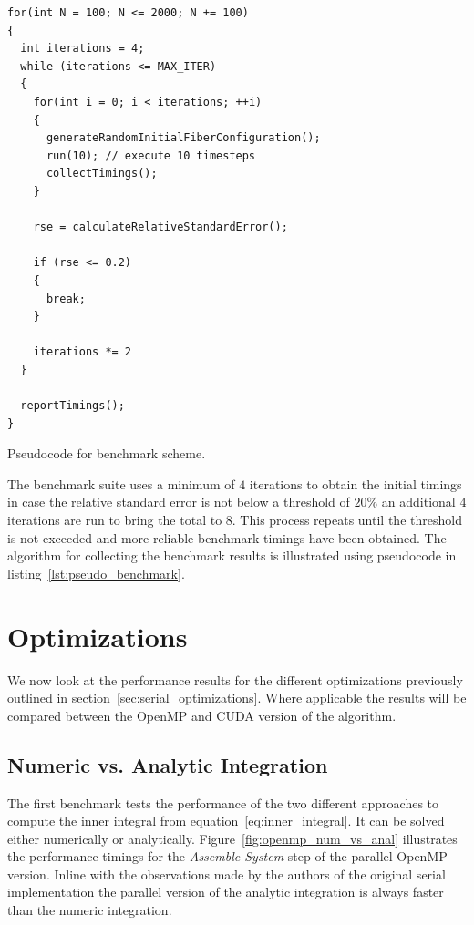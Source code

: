 \documentclass[a4paper,11pt]{kth-mag}
\begin{document}
\begin{listing}[!htbp]
  \centering
  \begin{verbatim}
for(int N = 100; N <= 2000; N += 100)
{
  int iterations = 4;
  while (iterations <= MAX_ITER)
  {
    for(int i = 0; i < iterations; ++i)
    {
      generateRandomInitialFiberConfiguration();
      run(10); // execute 10 timesteps
      collectTimings();
    }

    rse = calculateRelativeStandardError();

    if (rse <= 0.2)
    {
      break;
    }

    iterations *= 2
  }

  reportTimings();
}
  \end{verbatim}
  \caption{Pseudocode for benchmark scheme.}
  \label{lst:pseudo_benchmark}
\end{listing}

The benchmark suite uses a minimum of $4$ iterations to obtain the initial timings in case the relative standard error is not below a threshold of $20\%$ an additional $4$ iterations are run to bring the total to $8$. This process repeats until the threshold is not exceeded and more reliable benchmark timings have been obtained. The algorithm for collecting the benchmark results is illustrated using pseudocode in listing~\ref{lst:pseudo_benchmark}.

\section{Optimizations}

We now look at the performance results for the different optimizations previously outlined in section~\ref{sec:serial_optimizations}. Where applicable the results will be compared between the OpenMP and CUDA version of the algorithm.

\subsection{Numeric vs. Analytic Integration}
\label{subsec:bench_numeric_vs_analytic}

The first benchmark tests the performance of the two different approaches to compute the inner integral from equation~\eqref{eq:inner_integral}. It can be solved either numerically or analytically. Figure~\ref{fig:openmp_num_vs_anal} illustrates the performance timings for the \emph{Assemble System} step of the parallel OpenMP version. Inline with the observations made by the authors of the original serial implementation the parallel version of the analytic integration is always faster than the numeric integration.
\end{document}
